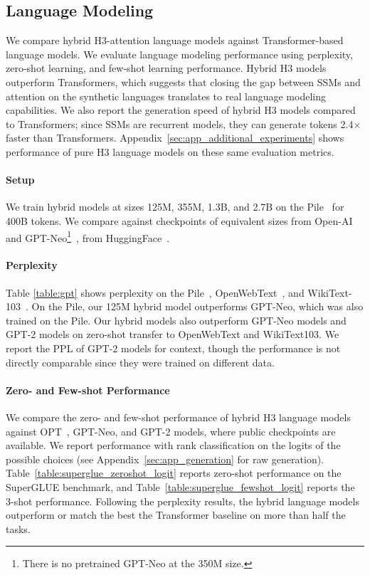 \subsection{Language Modeling}
\label{subsec:language_modeling}

We compare hybrid \textsc{H3}-attention language models against Transformer-based language models. We evaluate language modeling performance using perplexity, zero-shot learning, and few-shot learning performance. Hybrid \textsc{H3} models outperform Transformers, which suggests that closing the gap between SSMs and attention on the synthetic languages translates to real language modeling capabilities. We also report the generation speed of hybrid \textsc{H3} models compared to Transformers; since SSMs are recurrent models, they can generate tokens 2.4$\times$ faster than Transformers.
Appendix~\ref{sec:app_additional_experiments} shows performance of pure \textsc{H3} language models on these same evaluation metrics.

\paragraph{Setup}
We train hybrid models at sizes 125M, 355M, 1.3B, and 2.7B on the Pile~\citep{gao2020pile} for 400B tokens. We compare against checkpoints of equivalent sizes from Open-AI~\citep{radford2019language} and GPT-Neo\footnote{There
  is no pretrained GPT-Neo at the 350M size.}~\citep{gpt-neo}, from HuggingFace~\citep{wolf-etal-2020-transformers}.

\paragraph{Perplexity}
Table \ref{table:gpt} shows perplexity on the Pile~\citep{gao2020pile}, OpenWebText~\citep{Gokaslan2019OpenWeb}, and WikiText-103~\citep{merity2016pointer}. On the Pile, our 125M hybrid model outperforms GPT-Neo, which was also trained on the Pile. Our hybrid models also outperform GPT-Neo models and GPT-2 models on zero-shot transfer to OpenWebText and WikiText103. We report the PPL of GPT-2 models for context, though the performance is not directly comparable since they were trained on different data.

\paragraph{Zero- and Few-shot Performance} We compare the zero- and few-shot performance of hybrid \textsc{H3} language models against OPT~\citep{zhang2022opt}, GPT-Neo, and GPT-2 models, where public checkpoints are available. We report performance with rank classification on the logits of the possible choices (see Appendix~\ref{sec:app_generation} for raw generation).
Table~\ref{table:superglue_zeroshot_logit} reports zero-shot performance on the SuperGLUE benchmark, and Table~\ref{table:superglue_fewshot_logit} reports the 3-shot performance. Following the perplexity results, the hybrid language models outperform or match the best the Transformer baseline on more than half the tasks.

